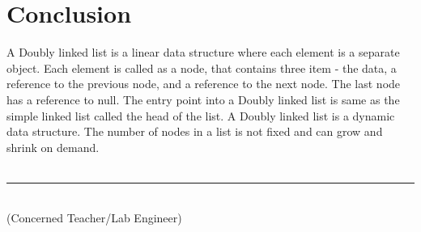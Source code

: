 \documentclass[11pt]{article}            %
\newcommand\tab[1][1cm]{\hspace*{#1}}
\begin{document}
\section{Conclusion}
A Doubly linked list is a linear data structure where each element is a separate object. Each element is called as a node, that contains three item - the data, a reference to the previous node, and a reference to the next node. The last node has a reference to null. The entry point into a Doubly linked list is same as the simple linked list called the head of the list. A Doubly linked list is a dynamic data structure. The number of nodes in a list is not fixed and can grow and shrink on demand.\\~\\

\tab[6cm] \noindent\rule{6cm}{0.4pt}\\
\tab[6cm] (Concerned Teacher/Lab Engineer)


 
\end{document}

